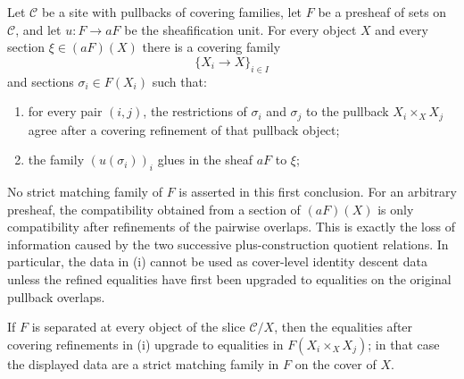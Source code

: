 \begin{lemma}\label{lem:strict-sheafification-representatives}
Let $\mathcal C$ be a site with pullbacks of covering families, let
$F$ be a presheaf of sets on $\mathcal C$, and let
$u:F\to aF$ be the sheafification unit. For every object $X$ and every
section $\xi\in(aF)(X)$ there is a covering family
\[
\{X_i\to X\}_{i\in I}
\]
and sections $\sigma_i\in F(X_i)$ such that:
\begin{enumerate}[label=(\roman*),nosep]
\item for every pair $(i,j)$, the restrictions of $\sigma_i$ and
$\sigma_j$ to the pullback $X_i\times_X X_j$ agree after a covering
refinement of that pullback object;
\item the family $(u(\sigma_i))_i$ glues in the sheaf $aF$ to $\xi$;
\end{enumerate}
No strict matching family of $F$ is asserted in this first conclusion.
For an arbitrary presheaf, the compatibility obtained from a section of
\((aF)(X)\) is only compatibility after refinements of the pairwise
overlaps. This is exactly the loss of information caused by the two
successive plus-construction quotient relations. In particular, the data
in \textup{(i)} cannot be used as cover-level identity descent data unless
the refined equalities have first been upgraded to equalities on the
original pullback overlaps.

If $F$ is separated at every object of the slice $\mathcal C/X$, then the
equalities after covering refinements in \textup{(i)} upgrade to
equalities in $F(X_i\times_X X_j)$; in that case the displayed data are a
strict matching family in $F$ on the cover of $X$.
\end{lemma}

